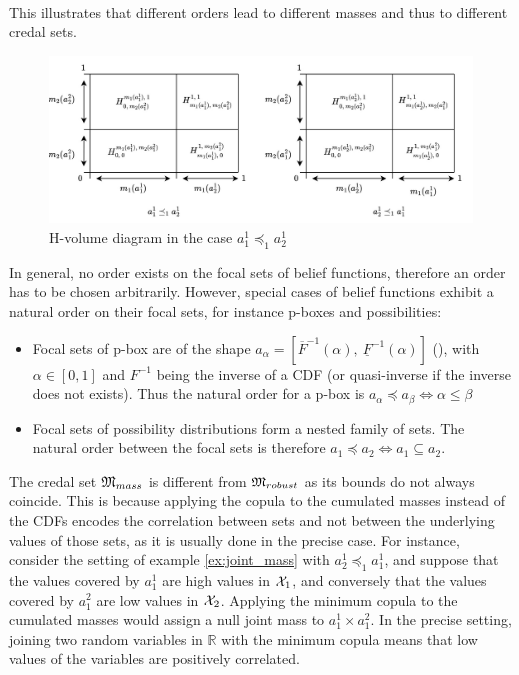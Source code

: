 \begin{example}
\begin{itemize}
\begin{eqnarray*}
        \end{eqnarray*}
    \end{itemize}
    This illustrates that different orders lead to different masses and thus to different credal sets.
    \begin{figure}[!ht]
        \centering
        \includegraphics[width=\linewidth]{Images/M_mass_h_volume.jpg}
        \caption{H-volume diagram in the case $a_1^1\preceq_1a_2^1$}
        \label{fig:joint_distrib_arb}
    \end{figure}
\end{example}

In general, no order exists on the focal sets of belief functions, therefore an order has to be chosen arbitrarily. However, special cases of belief functions exhibit a natural order on their focal sets, for instance p-boxes and possibilities:
\begin{itemize}
    \item Focal sets of p-box are of the shape $a_\alpha = [\overline{F}^{-1}(\alpha),~\underline{F}^{-1}(\alpha)]$ (\cite{destercke_unifying_2008}), with $\alpha\in [0,1]$ and $F^{-1}$ being the inverse of a CDF (or quasi-inverse if the inverse does not exists). Thus the natural order for a p-box is $a_\alpha\preceq a_\beta \Leftrightarrow \alpha\leqslant\beta$
    \item Focal sets of possibility distributions form a nested family of sets. The natural order between the focal sets is therefore $a_1\preceq a_2 \Leftrightarrow a_1 \subseteq a_2$.
\end{itemize}

The credal set ${\mathfrak{M}}_{mass}$ is different from ${\mathfrak{M}}_{robust}$ as its bounds do not always coincide. This is because applying the copula to the cumulated masses instead of the CDFs encodes the correlation between sets and not between the underlying values of those sets, as it is usually done in the precise case. For instance, consider the setting of example \ref{ex:joint_mass} with $a_2^1\preceq_1a_1^1$, and suppose that the values covered by $a^1_1$ are high values in ${\mathcal{X}}_1$, and conversely that the values covered by $a^2_1$ are low values in ${\mathcal{X}}_2$. Applying the minimum copula to the cumulated masses would assign a null joint mass to $a_1^1\times a_1^2$. In the precise setting, joining two random variables in $\mathbb{R}$ with the minimum copula means that low values of the variables are positively correlated.

